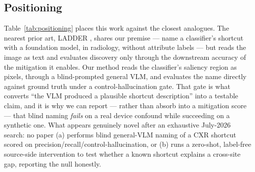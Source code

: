 \documentclass{ieeeaccess}
\begin{document}
\subsection{Positioning}
Table~\ref{tab:positioning} places this work against the closest analogues. The nearest prior art, LADDER \cite{ladder}, shares our premise --- name a classifier's shortcut with a foundation model, in radiology, without attribute labels --- but reads the image as text and evaluates discovery only through the downstream accuracy of the mitigation it enables. Our method reads the classifier's saliency region as pixels, through a blind-prompted general VLM, and evaluates the name directly against ground truth under a control-hallucination gate. That gate is what converts ``the VLM produced a plausible shortcut description'' into a testable claim, and it is why we can report --- rather than absorb into a mitigation score --- that blind naming \emph{fails} on a real device confound while succeeding on a synthetic one. What appears genuinely novel after an exhaustive July-2026 search: no paper (a) performs blind general-VLM naming of a CXR shortcut scored on precision/recall/control-hallucination, or (b) runs a zero-shot, label-free source-side intervention to test whether a known shortcut explains a cross-site gap, reporting the null honestly.
\end{document}

